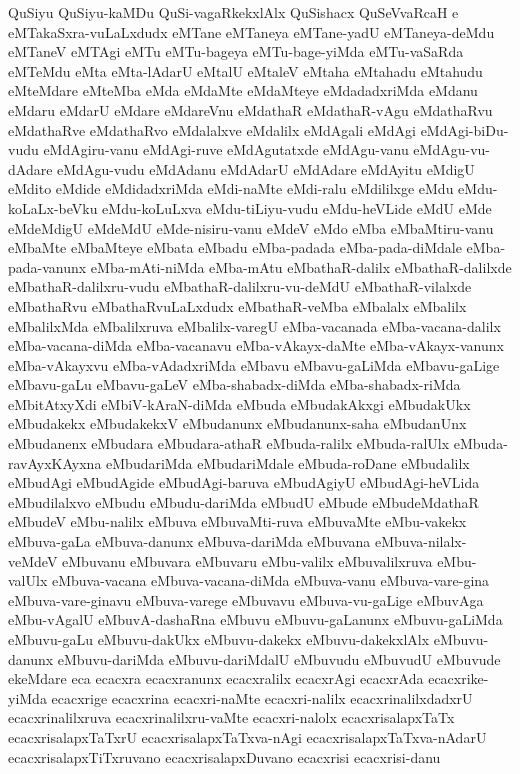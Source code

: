 {QuSiyu
QuSiyu-kaMDu
QuSi-vagaRkekxlAlx
QuSishacx
QuSeVvaRcaH
e
eMTakaSxra-vuLaLxdudx
eMTane
eMTaneya
eMTane-yadU
eMTaneya-deMdu
eMTaneV
eMTAgi
eMTu
eMTu-bageya
eMTu-bage-yiMda
eMTu-vaSaRda
eMTeMdu
eMta
eMta-lAdarU
eMtalU
eMtaleV
eMtaha
eMtahadu
eMtahudu
eMteMdare
eMteMba
eMda
eMdaMte
eMdaMteye
eMdadadxriMda
eMdanu
eMdaru
eMdarU
eMdare
eMdareVnu
eMdathaR
eMdathaR-vAgu
eMdathaRvu
eMdathaRve
eMdathaRvo
eMdalalxve
eMdalilx
eMdAgali
eMdAgi
eMdAgi-biDu-vudu
eMdAgiru-vanu
eMdAgi-ruve
eMdAgutatxde
eMdAgu-vanu
eMdAgu-vu-dAdare
eMdAgu-vudu
eMdAdanu
eMdAdarU
eMdAdare
eMdAyitu
eMdigU
eMdito
eMdide
eMdidadxriMda
eMdi-naMte
eMdi-ralu
eMdililxge
eMdu
eMdu-koLaLx-beVku
eMdu-koLuLxva
eMdu-tiLiyu-vudu
eMdu-heVLide
eMdU
eMde
eMdeMdigU
eMdeMdU
eMde-nisiru-vanu
eMdeV
eMdo
eMba
eMbaMtiru-vanu
eMbaMte
eMbaMteye
eMbata
eMbadu
eMba-padada
eMba-pada-diMdale
eMba-pada-vanunx
eMba-mAti-niMda
eMba-mAtu
eMbathaR-dalilx
eMbathaR-dalilxde
eMbathaR-dalilxru-vudu
eMbathaR-dalilxru-vu-deMdU
eMbathaR-vilalxde
eMbathaRvu
eMbathaRvuLaLxdudx
eMbathaR-veMba
eMbalalx
eMbalilx
eMbalilxMda
eMbalilxruva
eMbalilx-varegU
eMba-vacanada
eMba-vacana-dalilx
eMba-vacana-diMda
eMba-vacanavu
eMba-vAkayx-daMte
eMba-vAkayx-vanunx
eMba-vAkayxvu
eMba-vAdadxriMda
eMbavu
eMbavu-gaLiMda
eMbavu-gaLige
eMbavu-gaLu
eMbavu-gaLeV
eMba-shabadx-diMda
eMba-shabadx-riMda
eMbitAtxyXdi
eMbiV-kAraN-diMda
eMbuda
eMbudakAkxgi
eMbudakUkx
eMbudakekx
eMbudakekxV
eMbudanunx
eMbudanunx-saha
eMbudanUnx
eMbudanenx
eMbudara
eMbudara-athaR
eMbuda-ralilx
eMbuda-ralUlx
eMbuda-ravAyxKAyxna
eMbudariMda
eMbudariMdale
eMbuda-roDane
eMbudalilx
eMbudAgi
eMbudAgide
eMbudAgi-baruva
eMbudAgiyU
eMbudAgi-heVLida
eMbudilalxvo
eMbudu
eMbudu-dariMda
eMbudU
eMbude
eMbudeMdathaR
eMbudeV
eMbu-nalilx
eMbuva
eMbuvaMti-ruva
eMbuvaMte
eMbu-vakekx
eMbuva-gaLa
eMbuva-danunx
eMbuva-dariMda
eMbuvana
eMbuva-nilalx-veMdeV
eMbuvanu
eMbuvara
eMbuvaru
eMbu-valilx
eMbuvalilxruva
eMbu-valUlx
eMbuva-vacana
eMbuva-vacana-diMda
eMbuva-vanu
eMbuva-vare-gina
eMbuva-vare-ginavu
eMbuva-varege
eMbuvavu
eMbuva-vu-gaLige
eMbuvAga
eMbu-vAgalU
eMbuvA-dashaRna
eMbuvu
eMbuvu-gaLanunx
eMbuvu-gaLiMda
eMbuvu-gaLu
eMbuvu-dakUkx
eMbuvu-dakekx
eMbuvu-dakekxlAlx
eMbuvu-danunx
eMbuvu-dariMda
eMbuvu-dariMdalU
eMbuvudu
eMbuvudU
eMbuvude
ekeMdare
eca
ecacxra
ecacxranunx
ecacxralilx
ecacxrAgi
ecacxrAda
ecacxrike-yiMda
ecacxrige
ecacxrina
ecacxri-naMte
ecacxri-nalilx
ecacxrinalilxdadxrU
ecacxrinalilxruva
ecacxrinalilxru-vaMte
ecacxri-nalolx
ecacxrisalapxTaTx
ecacxrisalapxTaTxrU
ecacxrisalapxTaTxva-nAgi
ecacxrisalapxTaTxva-nAdarU
ecacxrisalapxTiTxruvano
ecacxrisalapxDuvano
ecacxrisi
ecacxrisi-danu
}
